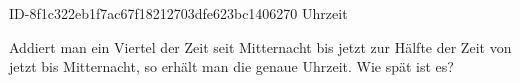 \begin{exercise}
      {ID-8f1c322eb1f7ac67f18212703dfe623bc1406270}
      {Uhrzeit}
  \ifproblem\problem\par
    Addiert man ein Viertel der Zeit seit Mitternacht bis jetzt zur Hälfte der
    Zeit von jetzt bis Mitternacht, so erhält man die genaue Uhrzeit.
    Wie spät ist es?
  \fi
\end{exercise}
